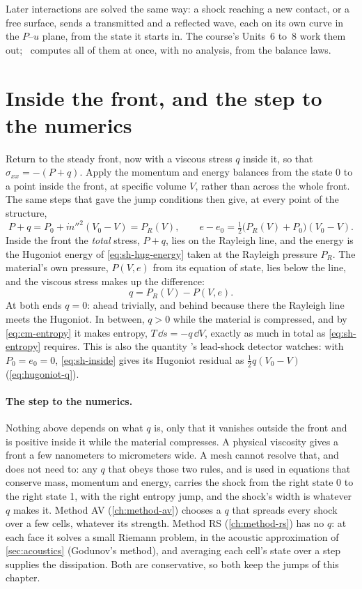 Later interactions are solved the same way: a shock reaching a new
contact, or a free surface, sends a transmitted and a reflected wave,
each on its own curve in the $P$--$u$ plane, from the state it starts in.
The course's Units~6 to~8 work them out; \bw\ computes all of them at once,
with no analysis, from the balance laws.

\section{Inside the front, and the step to the numerics}
\label{sec:inside-front}

Return to the steady front, now with a viscous stress $q$ inside it, so
that $\sigma_{xx} = -(P + q)$. Apply the momentum and energy balances from
the state 0 to a point inside the front, at specific volume $V$, rather
than across the whole front. The same steps that gave the jump conditions
then give, at every point of the structure,
\begin{equation}
P + q = P_0 + \dot m''^2 (V_0 - V) = P_R(V),
\qquad
e - e_0 = \tfrac{1}{2}\bigl(P_R(V) + P_0\bigr)(V_0 - V).
\label{eq:sh-inside}
\end{equation}
Inside the front the \emph{total} stress, $P + q$, lies on the Rayleigh
line, and the energy is the Hugoniot energy of \cref{eq:sh-hug-energy}
taken at the Rayleigh pressure $P_R$. The material's own pressure, $P(V,
e)$ from its equation of state, lies below the line, and the viscous
stress makes up the difference:
\begin{equation}
q = P_R(V) - P(V, e) .
\label{eq:sh-q}
\end{equation}
At both ends $q = 0$: ahead trivially, and behind because there the
Rayleigh line meets the Hugoniot. In between, $q > 0$ while the material
is compressed, and by \cref{eq:cm-entropy} it makes entropy, $T\,\dd s =
-q\,\dd V$, exactly as much in total as \cref{eq:sh-entropy} requires. This
is also the quantity \bw's lead-shock detector watches: with $P_0 = e_0 =
0$, \cref{eq:sh-inside} gives its Hugoniot residual as $\tfrac{1}{2}q(V_0
- V)$ (\cref{eq:hugoniot-q}).

\paragraph{The step to the numerics.} Nothing above depends on what $q$ is,
only that it vanishes outside the front and is positive inside it while
the material compresses. A physical viscosity gives a front a few
nanometers to micrometers wide. A mesh cannot resolve that, and does not
need to: any $q$ that obeys those two rules, and is used in equations that
conserve mass, momentum and energy, carries the shock from the right state
0 to the right state 1, with the right entropy jump, and the shock's width
is whatever $q$ makes it. Method AV (\cref{ch:method-av}) chooses a $q$ that
spreads every shock over a few cells, whatever its strength. Method RS
(\cref{ch:method-rs}) has no $q$: at each face it solves a small Riemann
problem, in the acoustic approximation of \cref{sec:acoustics} (Godunov's
method), and averaging each cell's state over a step supplies the
dissipation. Both are conservative, so both keep the jumps of this
chapter.
